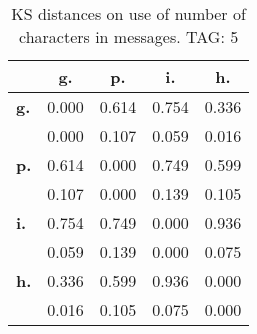 \begin{table}[h!]
\begin{center}
\begin{tabular}{| l || c | c | c | c |}\hline
 & {\bf g.} & {\bf p.} & {\bf i.} & {\bf h.} \\\hline\hline
{\bf g.} & 0.000 & 0.614 & 0.754 & 0.336 \\
{\bf } & 0.000 & 0.107 & 0.059 & 0.016 \\\hline
{\bf p.} & 0.614 & 0.000 & 0.749 & 0.599 \\
{\bf } & 0.107 & 0.000 & 0.139 & 0.105 \\\hline
{\bf i.} & 0.754 & 0.749 & 0.000 & 0.936 \\
{\bf } & 0.059 & 0.139 & 0.000 & 0.075 \\\hline
{\bf h.} & 0.336 & 0.599 & 0.936 & 0.000 \\
{\bf } & 0.016 & 0.105 & 0.075 & 0.000 \\\hline
\end{tabular}
\caption{KS distances on use of number of characters in messages. TAG: 5}
\end{center}
\end{table}